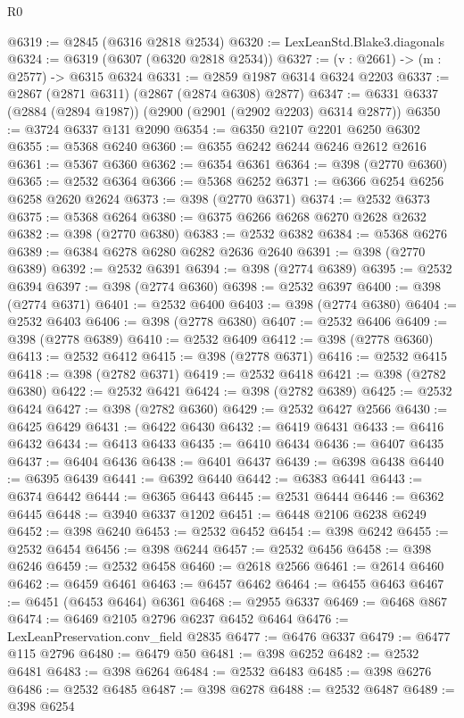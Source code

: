 \begin{lexlean}{R0}
\begin{coremodule}
@6319 := @2845 (@6316 @2818 @2534)
@6320 := LexLeanStd.Blake3.diagonals
@6324 := @6319 (@6307 (@6320 @2818 @2534))
@6327 := (v : @2661) -> (m : @2577) -> @6315 @6324
@6331 := @2859 @1987 @6314 @6324 @2203
@6337 := @2867 (@2871 @6311) (@2867 (@2874 @6308) @2877)
@6347 := @6331 @6337 (@2884 (@2894 @1987)) (@2900 (@2901 (@2902 @2203) @6314 @2877))
@6350 := @3724 @6337 @131 @2090
@6354 := @6350 @2107 @2201 @6250 @6302
@6355 := @5368 @6240
@6360 := @6355 @6242 @6244 @6246 @2612 @2616
@6361 := @5367 @6360
@6362 := @6354 @6361
@6364 := @398 (@2770 @6360)
@6365 := @2532 @6364
@6366 := @5368 @6252
@6371 := @6366 @6254 @6256 @6258 @2620 @2624
@6373 := @398 (@2770 @6371)
@6374 := @2532 @6373
@6375 := @5368 @6264
@6380 := @6375 @6266 @6268 @6270 @2628 @2632
@6382 := @398 (@2770 @6380)
@6383 := @2532 @6382
@6384 := @5368 @6276
@6389 := @6384 @6278 @6280 @6282 @2636 @2640
@6391 := @398 (@2770 @6389)
@6392 := @2532 @6391
@6394 := @398 (@2774 @6389)
@6395 := @2532 @6394
@6397 := @398 (@2774 @6360)
@6398 := @2532 @6397
@6400 := @398 (@2774 @6371)
@6401 := @2532 @6400
@6403 := @398 (@2774 @6380)
@6404 := @2532 @6403
@6406 := @398 (@2778 @6380)
@6407 := @2532 @6406
@6409 := @398 (@2778 @6389)
@6410 := @2532 @6409
@6412 := @398 (@2778 @6360)
@6413 := @2532 @6412
@6415 := @398 (@2778 @6371)
@6416 := @2532 @6415
@6418 := @398 (@2782 @6371)
@6419 := @2532 @6418
@6421 := @398 (@2782 @6380)
@6422 := @2532 @6421
@6424 := @398 (@2782 @6389)
@6425 := @2532 @6424
@6427 := @398 (@2782 @6360)
@6429 := @2532 @6427 @2566
@6430 := @6425 @6429
@6431 := @6422 @6430
@6432 := @6419 @6431
@6433 := @6416 @6432
@6434 := @6413 @6433
@6435 := @6410 @6434
@6436 := @6407 @6435
@6437 := @6404 @6436
@6438 := @6401 @6437
@6439 := @6398 @6438
@6440 := @6395 @6439
@6441 := @6392 @6440
@6442 := @6383 @6441
@6443 := @6374 @6442
@6444 := @6365 @6443
@6445 := @2531 @6444
@6446 := @6362 @6445
@6448 := @3940 @6337 @1202
@6451 := @6448 @2106 @6238 @6249
@6452 := @398 @6240
@6453 := @2532 @6452
@6454 := @398 @6242
@6455 := @2532 @6454
@6456 := @398 @6244
@6457 := @2532 @6456
@6458 := @398 @6246
@6459 := @2532 @6458
@6460 := @2618 @2566
@6461 := @2614 @6460
@6462 := @6459 @6461
@6463 := @6457 @6462
@6464 := @6455 @6463
@6467 := @6451 (@6453 @6464) @6361
@6468 := @2955 @6337
@6469 := @6468 @867
@6474 := @6469 @2105 @2796 @6237 @6452 @6464
@6476 := LexLeanPreservation.conv_field @2835
@6477 := @6476 @6337
@6479 := @6477 @115 @2796
@6480 := @6479 @50
@6481 := @398 @6252
@6482 := @2532 @6481
@6483 := @398 @6264
@6484 := @2532 @6483
@6485 := @398 @6276
@6486 := @2532 @6485
@6487 := @398 @6278
@6488 := @2532 @6487
@6489 := @398 @6254

\end{coremodule}
\end{lexlean}
